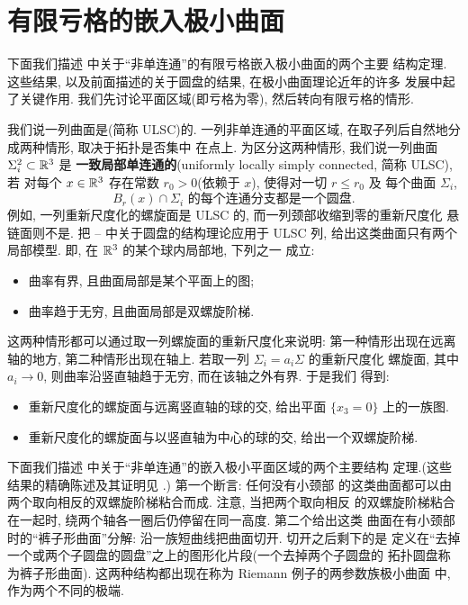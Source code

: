 \section{有限亏格的嵌入极小曲面}
\label{sec:8.5}

下面我们描述 \cite{CM7} 中关于``非单连通''的有限亏格嵌入极小曲面的两个主要
结构定理. 这些结果, 以及前面描述的关于圆盘的结果, 在极小曲面理论近年的许多
发展中起了关键作用. 我们先讨论平面区域(即亏格为零), 然后转向有限亏格的情形.

我们说一列曲面是(简称 ULSC)的. 一列非单连通的平面区域, 在取子列后自然地分成两种情形, 取决于拓扑是否集中
在点上. 为区分这两种情形, 我们说一列曲面 $\Sigma_i^2\subset\mathbb{R}^3$ 是
\textbf{一致局部单连通的}(uniformly locally simply connected, 简称 ULSC), 若
对每个 $x\in\mathbb{R}^3$ 存在常数 $r_0>0$(依赖于 $x$), 使得对一切 $r\leq r_0$ 及
每个曲面 $\Sigma_i$,
\begin{equation}
B_r(x)\cap\Sigma_i\text{ 的每个连通分支都是一个圆盘.}
\label{eq:8.96}
\end{equation}
例如, 一列重新尺度化的螺旋面是 ULSC 的, 而一列颈部收缩到零的重新尺度化
悬链面则不是. 把 \cite{CM3}--\cite{CM6} 中关于圆盘的结构理论应用于 ULSC
列, 给出这类曲面只有两个局部模型. 即, 在 $\mathbb{R}^3$ 的某个球内局部地, 下列之一
成立:

\begin{itemize}
\item 曲率有界, 且曲面局部是某个平面上的图;
\item 曲率趋于无穷, 且曲面局部是双螺旋阶梯.
\end{itemize}

这两种情形都可以通过取一列螺旋面的重新尺度化来说明: 第一种情形出现在远离
轴的地方, 第二种情形出现在轴上. 若取一列 $\Sigma_i=a_i\Sigma$ 的重新尺度化
螺旋面, 其中 $a_i\to0$, 则曲率沿竖直轴趋于无穷, 而在该轴之外有界. 于是我们
得到:

\begin{itemize}
\item 重新尺度化的螺旋面与远离竖直轴的球的交, 给出平面 $\{x_3=0\}$ 上的一族图.
\item 重新尺度化的螺旋面与以竖直轴为中心的球的交, 给出一个双螺旋阶梯.
\end{itemize}

下面我们描述 \cite{CM7} 中关于``非单连通''的嵌入极小平面区域的两个主要结构
定理.(这些结果的精确陈述及其证明见 \cite{CM7}.) 第一个断言: 任何没有小颈部
的这类曲面都可以由两个取向相反的双螺旋阶梯粘合而成. 注意, 当把两个取向相反
的双螺旋阶梯粘合在一起时, 绕两个轴各一圈后仍停留在同一高度. 第二个给出这类
曲面在有小颈部时的``裤子形曲面''分解: 沿一族短曲线把曲面切开. 切开之后剩下的是
定义在``去掉一个或两个子圆盘的圆盘''之上的图形化片段(一个去掉两个子圆盘的
拓扑圆盘称为裤子形曲面). 这两种结构都出现在称为 Riemann 例子的两参数族极小曲面
中, 作为两个不同的极端.

